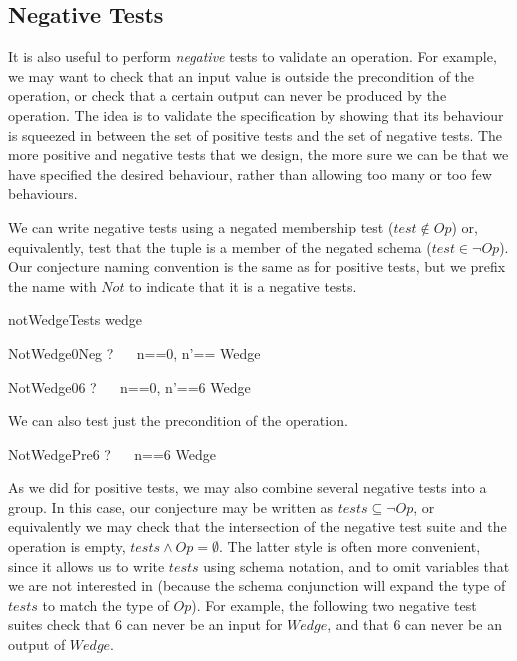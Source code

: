 \documentclass{llncs}
\begin{document}
\subsection{Negative Tests}

It is also useful to perform \emph{negative} tests to validate an
operation.  For example, we may want to check that an input value is
outside the precondition of the operation, or check that a certain output
can never be produced by the operation.  The idea is to validate the
specification by showing that its behaviour is squeezed in between the set
of positive tests and the set of negative tests.  The more positive and
negative tests that we design, the more sure we can be that we have
specified the desired behaviour, rather than allowing too many or too few
behaviours.

We can write negative tests using a negated membership test ($test \notin
Op$) or, equivalently, test that the tuple is a member of the negated
schema ($test \in \lnot Op$).
Our conjecture naming convention is the same as for positive tests, but
we prefix the name with $Not$ to indicate that it is a negative tests.

\begin{zsection}
  \SECTION notWedgeTests \parents wedge
\end{zsection}

\begin{theorem}{NotWedge0Neg}
\vdash? ~~ \lblot n==0, n'== \rblot \notin Wedge
\end{theorem}

\begin{theorem}{NotWedge06}
\vdash? ~~ \lblot n==0, n'==6 \rblot \in \lnot Wedge
\end{theorem}

We can also test just the precondition of the operation.
\begin{theorem}{NotWedgePre6}
\vdash? ~~ \lblot n==6 \rblot \notin \pre Wedge
\end{theorem}

As we did for positive tests, we may also combine several negative tests
into a group.  In this case, our conjecture may be written as $tests
\subseteq \lnot Op$, or equivalently we may check that the intersection of
the negative test suite and the operation is empty, $tests \land Op =
\emptyset$.  The latter style is often more convenient, since it allows us
to write $tests$ using schema notation, and to omit variables that we are
not interested in (because the schema conjunction will expand the type of
$tests$ to match the type of $Op$).  For example, the following two negative
test suites check that 6 can never be an input for $Wedge$, and that 6 can
never be an output of $Wedge$.
\end{document}
